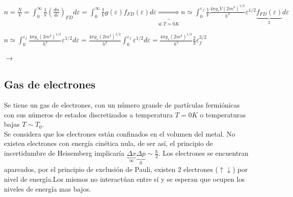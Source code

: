 \documentclass[oneside]{book}
\numberwithin{equation}{section}
\numberwithin{figure}{section}
\numberwithin{table}{section}
\begin{document}
				$\displaystyle n=\frac{N}{V}=\int_0^\infty \frac{1}{V}\left(\frac{dn}{d\varepsilon}\right)_{FD} d\varepsilon=\int_0^\infty \frac{1}{V} g(\varepsilon)f_{FD}(\varepsilon) d\varepsilon \underbrace{\Longrightarrow}_{\text{si } T\simeq 0 K} n \simeq \int_0^{\varepsilon_f} \frac{1}{V} \frac{4\pi g_s V (2m^3)^{1/2}}{h^3} \varepsilon^{1/2} \underbrace{f_{FD}(\varepsilon)}_{1} d\varepsilon$
				
				\begin{center}
					$\displaystyle  n \simeq \int_0^{\varepsilon_f} \frac{4\pi g_s (2m^3)^{1/2}}{h^3} \varepsilon^{1/2}  d\varepsilon=\frac{4\pi g_s (2m^3)^{1/2}}{h^3} \int_0^{\varepsilon_f} \varepsilon^{1/2}  d\varepsilon=\frac{4\pi g_s (2m^3)^{1/2}}{h^3} \frac{2}{3}\varepsilon_f^{3/2}$
				\end{center}
				
				\begin{center}
					 $\longrightarrow$ 
				\end{center}
			
			\subsection{Gas de electrones}
			
				Se tiene un gas de electrones, con un número grande de partículas fermiónicas con sus números de estados discretizados a temperatura $T= 0K$ o temperaturas bajas $T \sim T_0$.\\
				
				Se considera que los electrones están confinados en el volumen del metal. No existen electrones con energía cinética nula, de ser así, el principio de incertidumbre de Heisemberg implicaría $\displaystyle \underbrace{\Delta x}_{\infty} \underbrace{\Delta p}_0 \sim \frac{\hbar}{2}$. Los electrones se encuentran apareados, por el principio de exclusión de Pauli, existen 2 electrones ($\uparrow \downarrow$) por nivel de energía.Los mismos no interactúan entre sí y se esperan que ocupen los niveles de energía mas bajos.
				
\end{document}
